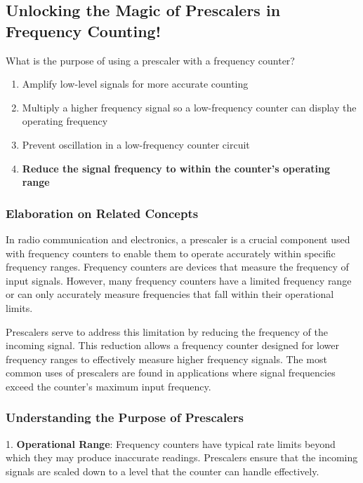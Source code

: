 \subsection{Unlocking the Magic of Prescalers in Frequency Counting!}

\begin{tcolorbox}[colback=gray!10, colframe=black, title=E4A05]  
What is the purpose of using a prescaler with a frequency counter?  
\begin{enumerate}[label=\Alph*.]
    \item Amplify low-level signals for more accurate counting
    \item Multiply a higher frequency signal so a low-frequency counter can display the operating frequency
    \item Prevent oscillation in a low-frequency counter circuit
    \item \textbf{Reduce the signal frequency to within the counter's operating range}
\end{enumerate} \end{tcolorbox}

\subsubsection{Elaboration on Related Concepts}

In radio communication and electronics, a prescaler is a crucial component used with frequency counters to enable them to operate accurately within specific frequency ranges. Frequency counters are devices that measure the frequency of input signals. However, many frequency counters have a limited frequency range or can only accurately measure frequencies that fall within their operational limits.

Prescalers serve to address this limitation by reducing the frequency of the incoming signal. This reduction allows a frequency counter designed for lower frequency ranges to effectively measure higher frequency signals. The most common uses of prescalers are found in applications where signal frequencies exceed the counter's maximum input frequency.

\subsubsection{Understanding the Purpose of Prescalers}

1. \textbf{Operational Range}: Frequency counters have typical rate limits beyond which they may produce inaccurate readings. Prescalers ensure that the incoming signals are scaled down to a level that the counter can handle effectively.

